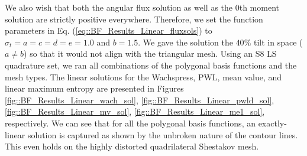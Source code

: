 \noindent We also wish that both the angular flux solution as well as the 0th moment solution are strictly positive everywhere. Therefore, we set the function parameters in Eq. (\ref{eq::BF_Results_Linear_fluxsols}) to $\sigma_t = a = c = d = e = 1.0$ and $b = 1.5$. We gave the solution the $40 \%$ tilt in space ($a \neq b$) so that it would not align with the triangular mesh. Using an S8 LS quadrature set, we ran all combinations of the polygonal basis functions and the mesh types. The linear solutions for the Wachspress, PWL, mean value, and linear maximum entropy are presented in Figures \ref{fig::BF_Results_Linear_wach_sol}, \ref{fig::BF_Results_Linear_pwld_sol}, \ref{fig::BF_Results_Linear_mv_sol}, \ref{fig::BF_Results_Linear_me1_sol}, respectively. We can see that for all the polygonal basis functions, an exactly-linear solution is captured as shown by the unbroken nature of the contour lines. This even holds on the highly distorted quadrilateral Shestakov mesh.

